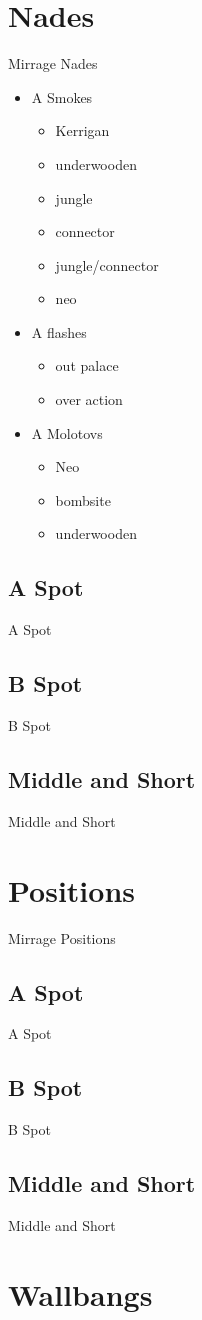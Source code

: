 \section{Nades}
\label{sect:Mirrage_nades}
Mirrage Nades
\begin{itemize}
\item A Smokes
	\begin{itemize}
	\item Kerrigan
	\item underwooden
	\item jungle
	\item connector
	\item jungle/connector
	\item neo
	\end{itemize}
\item A flashes
	\begin{itemize}
	\item out palace
	\item over action
	\end{itemize}
\item A Molotovs
	\begin{itemize}
	\item Neo
	\item bombsite
	\item underwooden
	\end{itemize}
\end{itemize}

\subsection{A Spot}
\label{subsect:Mirrage_nades_A}
A Spot

\subsection{B Spot}
\label{subsect:Mirrage_nades_B}
B Spot

\subsection{Middle and Short}
\label{subsect:Mirrage_nades_mid_short}
Middle and Short

\section{Positions}
\label{sect:Mirrage_positions}
Mirrage Positions

\subsection{A Spot}
\label{subsect:Mirrage_positions_A}
A Spot

\subsection{B Spot}
\label{subsect:Mirrage_positions_B}
B Spot

\subsection{Middle and Short}
\label{subsect:Mirrage_positions_mid}
Middle and Short

\section{Wallbangs}